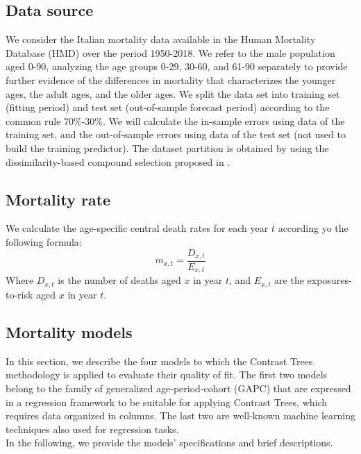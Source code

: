 \documentclass[fleqn,10pt]{wlscirep}
\begin{document}
\subsection*{Data source}

We consider the Italian mortality data available in the Human Mortality Database (HMD) over the period 1950-2018. We refer to the male population aged \color{blue}0-90, analyzing the age groups 0-29, 30-60, and 61-90 separately to provide further evidence of the differences in mortality that characterizes the younger ages, the adult ages, and the older ages. 
We split the data set into training set (fitting period) and test set (out-of-sample forecast period) according to the common rule 70\%-30\%. We will calculate the in-sample errors using data of the training set, and the out-of-sample errors using data of the test set (not used to build the training predictor).
\color{black}
The dataset partition is obtained by using the dissimilarity-based compound selection proposed in \cite{Willett1999}.

\subsection*{Mortality rate}
We calculate the age-specific central death rates for each year $t$ according yo the following formula:
\begin{equation} 
\label{eq:mxt}
m_{x,t}=\frac{D_{x,t}}{E_{x,t}}
\end{equation}
Where $D_{x,t}$ is the number of deaths aged $x$ in year $t$, and $E_{x,t}$ are the exposures-to-risk aged $x$ in year $t$.

\subsection*{Mortality models}
In this section, we describe the four models to which the Contrast Trees methodology is applied to evaluate their quality of fit.
The first two models belong to the family of generalized age-period-cohort (GAPC) that are expressed in a regression framework to be suitable for applying Contrast Trees, which requires data organized in columns. The last two are well-known machine learning techniques also used for regression tasks.\\
In the following, we provide the models' specifications and brief descriptions.
\end{document}
